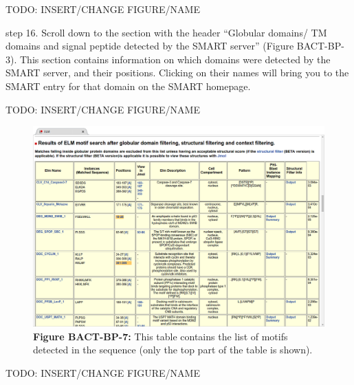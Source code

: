 
TODO: INSERT/CHANGE FIGURE/NAME

step 16. Scroll down to the section with the header ``Globular domains/
TM domains and signal peptide detected by the SMART server'' (Figure
BACT-BP-3). This section contains information on which domains were
detected by the SMART server, and their positions. Clicking on their
names will bring you to the SMART entry for that domain on the SMART
homepage.

TODO: INSERT/CHANGE FIGURE/NAME

\begin{figure}[h!]
\centering
\includegraphics[width=\textwidth]{Figures/TP53_1/elm_results_motifs.png}
\caption{
\textbf{Figure BACT-BP-7:} This table contains the list of motifs
detected in the sequence (only the top part of the table is shown).
}
\end{figure}

TODO: INSERT/CHANGE FIGURE/NAME

